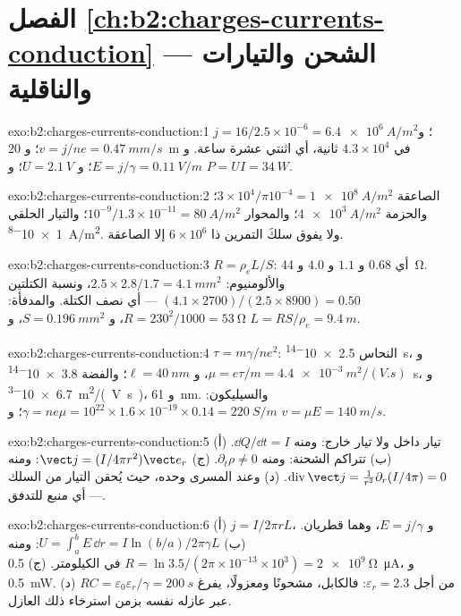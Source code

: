 \section*{الفصل \ref{ch:b2:charges-currents-conduction} --- الشحن والتيارات والناقلية}

\begin{solution}{exo:b2:charges-currents-conduction:1}
$j = 16/2.5 \times 10^{-6} = \qty{6.4e6}{A/m^2}$؛ و $v = j/ne = \qty{0.47}{mm/s}$؛ و \qty{20}{m}
في $4.3 \times 10^4$ ثانية، أي اثنتي عشرة ساعة. و $E = j/\gamma = \qty{0.11}{V/m}$؛ و $U = \qty{2.1}{V}$؛
و $P = UI = \qty{34}{W}$.
\end{solution}

\begin{solution}{exo:b2:charges-currents-conduction:2}
الصاعقة $3 \times 10^4/\pi10^{-4} = \qty{1e8}{A/m^2}$؛ والحزمة $\qty{4e3}{A/m^2}$؛ والمحوار
$10^{-9}/1.3 \times 10^{-11} = \qty{80}{A/m^2}$؛ والتيار الحلقي \qty{1e-8}{A/m^2}. ولا يفوق
سلكَ التمرين ذا $6 \times 10^6$ إلا الصاعقة.
\end{solution}

\begin{solution}{exo:b2:charges-currents-conduction:3}
$R = \rho_eL/S$: أي $0.68$ و $1.1$ و $4.0$ و \qty{44}{\ohm}. والألومنيوم: $2.5 \times 2.8/1.7 =
\qty{4.1}{mm^2}$، ونسبة الكتلتين $(4.1 \times 2700)/(2.5 \times 8900) = 0.50$ --- أي نصف الكتلة.
والمدفأة: $R = 230^2/1000 = \qty{53}{\ohm}$، و $S = \qty{0.196}{mm^2}$، و $L = RS/\rho_e = \qty{9.4}{m}$.
\end{solution}

\begin{solution}{exo:b2:charges-currents-conduction:4}
$\tau = m\gamma/ne^2$: النحاس \qty{2.5e-14}{s}، و $\mu = e\tau/m = \qty{4.4e-3}{m^2/(V.s)}$،
و $\ell = \qty{40}{nm}$؛ والفضة \qty{3.8e-14}{s}، و \qty{6.7e-3}{m^2/(V.s)}، و \qty{61}{nm}.
والسيليكون: $\gamma = ne\mu = 10^{22} \times 1.6 \times 10^{-19} \times 0.14 = \qty{220}{S/m}$؛ و $v =
\mu E = \qty{140}{m/s}$.
\end{solution}

\begin{solution}{exo:b2:charges-currents-conduction:5}
(أ) تيار داخل ولا تيار خارج: ومنه $\dd Q/\dd t = I$. (ب) تتراكم الشحنة: ومنه $\partial_t
\rho \ne 0$. (ج) $\vect j = (I/4\pi r^2)\vect e_r$: ومنه $\operatorname{div}\vect j = \frac1{r^2}
\partial_r(I/4\pi) = 0$. (د) وعند المسرى وحده، حيث يُحقن التيار
من السلك --- أي منبع للتدفق.
\end{solution}

\begin{solution}{exo:b2:charges-currents-conduction:6}
(أ) $j = I/2\pi rL$، و $E = j/\gamma$، وهما قطريان. (ب) $U = \int_a^bE\,\dd r = I\ln(b/a)/
2\pi\gamma L$: ومنه $R = \ln3.5/(2\pi \times 10^{-13} \times 10^3) = \qty{2e9}{\ohm}$ في الكيلومتر.
(ج) \qty{0.5}{\micro A}، و \qty{0.5}{mW}. (د) $RC = \varepsilon_0\varepsilon_r/\gamma = \qty{200}{s}$ من أجل
$\varepsilon_r = 2.3$: فالكابل، مشحونًا ومعزولًا، يفرغ عبر عازله
نفسه بزمن استرخاء ذلك العازل.
\end{solution}

